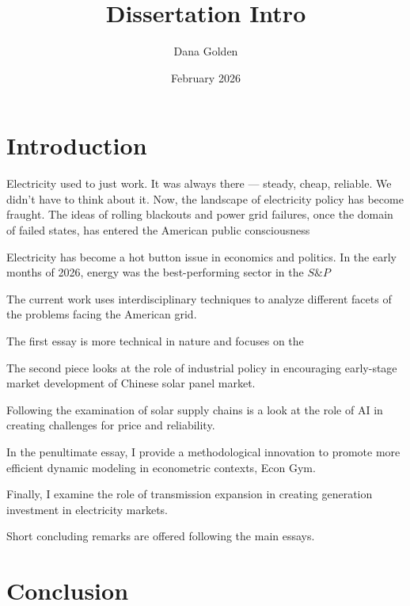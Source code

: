 \documentclass{article}
\title{Dissertation Intro}
\author{Dana Golden}
\date{February 2026}
\begin{document}
\maketitle

\section{Introduction}

Electricity used to just work. It was always there — steady, cheap, reliable. We didn't have to think about it. Now, the landscape of electricity policy has become fraught. The ideas of rolling blackouts and power grid failures, once the domain of failed states, has entered the American public consciousness

Electricity has become a hot button issue in economics and politics. In the early months of 2026, energy was the best-performing sector in the $S\&P$

The current work uses interdisciplinary techniques to analyze different facets of the problems facing the American grid.

The first essay is more technical in nature and focuses on the 

The second piece looks at the role of industrial policy in encouraging early-stage market development of Chinese solar panel market.

Following the examination of solar supply chains is a look at the role of AI in creating challenges for price and reliability.

In the penultimate essay, I provide a methodological innovation to promote more efficient dynamic modeling in econometric contexts, Econ Gym.

Finally, I examine the role of transmission expansion in creating generation investment in electricity markets.

Short concluding remarks are offered following the main essays.

\section{Conclusion}
\end{document}
